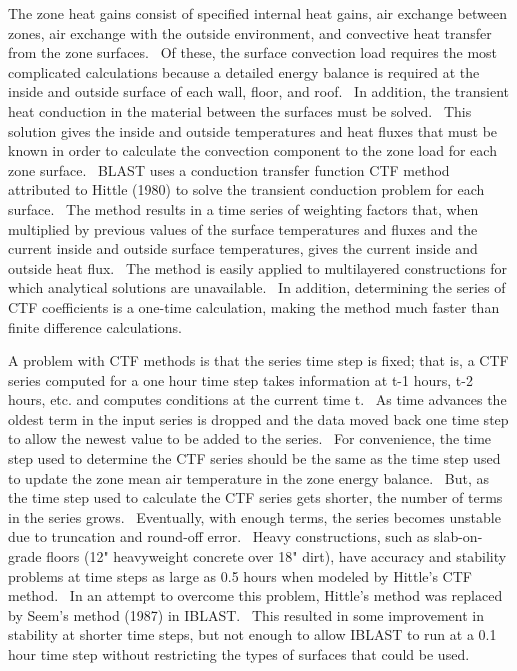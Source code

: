 The zone heat gains consist of specified internal heat gains, air exchange between zones, air exchange with the outside environment, and convective heat transfer from the zone surfaces.~ Of these, the surface convection load requires the most complicated calculations because a detailed energy balance is required at the inside and outside surface of each wall, floor, and roof.~ In addition, the transient heat conduction in the material between the surfaces must be solved.~ This solution gives the inside and outside temperatures and heat fluxes that must be known in order to calculate the convection component to the zone load for each zone surface.~ BLAST uses a conduction transfer function CTF method attributed to Hittle (1980) to solve the transient conduction problem for each surface.~ The method results in a time series of weighting factors that, when multiplied by previous values of the surface temperatures and fluxes and the current inside and outside surface temperatures, gives the current inside and outside heat flux.~ The method is easily applied to multilayered constructions for which analytical solutions are unavailable.~ In addition, determining the series of CTF coefficients is a one-time calculation, making the method much faster than finite difference calculations.

A problem with CTF methods is that the series time step is fixed; that is, a CTF series computed for a one hour time step takes information at t-1 hours, t-2 hours, etc. and computes conditions at the current time t.~ As time advances the oldest term in the input series is dropped and the data moved back one time step to allow the newest value to be added to the series.~ For convenience, the time step used to determine the CTF series should be the same as the time step used to update the zone mean air temperature in the zone energy balance.~ But, as the time step used to calculate the CTF series gets shorter, the number of terms in the series grows.~ Eventually, with enough terms, the series becomes unstable due to truncation and round-off error.~ Heavy constructions, such as slab-on-grade floors (12" heavyweight concrete over 18" dirt), have accuracy and stability problems at time steps as large as 0.5 hours when modeled by Hittle's CTF method.~ In an attempt to overcome this problem, Hittle's method was replaced by Seem's method (1987) in IBLAST.~ This resulted in some improvement in stability at shorter time steps, but not enough to allow IBLAST to run at a 0.1 hour time step without restricting the types of surfaces that could be used.

